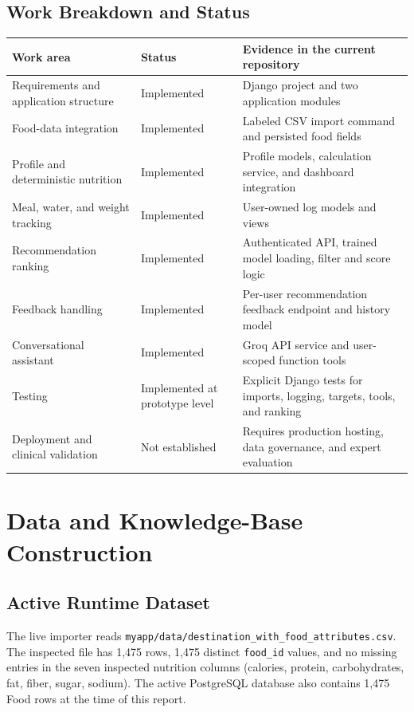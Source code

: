 \documentclass[12pt,a4paper]{report}
\begin{document}
\section{Work Breakdown and Status}
\begin{longtable}{p{}p{}p{}}
\toprule
Work area & Status & Evidence in the current repository\\
\midrule
Requirements and application structure & Implemented & Django project and two application modules\\
Food-data integration & Implemented & Labeled CSV import command and persisted food fields\\
Profile and deterministic nutrition & Implemented & Profile models, calculation service, and dashboard integration\\
Meal, water, and weight tracking & Implemented & User-owned log models and views\\
Recommendation ranking & Implemented & Authenticated API, trained model loading, filter and score logic\\
Feedback handling & Implemented & Per-user recommendation feedback endpoint and history model\\
Conversational assistant & Implemented & Groq API service and user-scoped function tools\\
Testing & Implemented at prototype level & Explicit Django tests for imports, logging, targets, tools, and ranking\\
Deployment and clinical validation & Not established & Requires production hosting, data governance, and expert evaluation\\
\bottomrule
\end{longtable}

\chapter{Data and Knowledge-Base Construction}
\section{Active Runtime Dataset}
The live importer reads \texttt{myapp/data/destination\_with\_food\_attributes.csv}.
The inspected file has 1,475 rows, 1,475 distinct \texttt{food\_id} values, and no
missing entries in the seven inspected nutrition columns (calories, protein,
carbohydrates, fat, fiber, sugar, sodium). The active PostgreSQL database also contains
1,475 Food rows at the time of this report.
\end{document}
